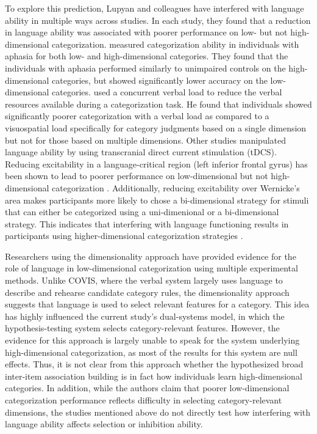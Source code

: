 \documentclass[../dissertation.tex]{subfiles}
\begin{document}
	To explore this prediction, Lupyan and colleagues have interfered with language ability in multiple ways across studies. In each study, they found that a reduction in language ability was associated with poorer performance on low- but not high-dimensional categorization. \citet{Lupyan2013} measured categorization ability in individuals with aphasia for both low- and high-dimensional categories. They found that the individuals with aphasia performed similarly to unimpaired controls on the high-dimensional categories, but showed significantly lower accuracy on the low-dimensional categories. \citet{Lupyan2009} used a concurrent verbal load to reduce the verbal resources available during a categorization task. He found that individuals showed significantly poorer categorization with a verbal load as compared to a visuospatial load specifically for category judgments based on a single dimension but not for those based on multiple dimensions. Other studies manipulated language ability by using transcranial direct current stimulation (tDCS). Reducing excitability in a language-critical region (left inferior frontal gyrus) has been shown to lead to poorer performance on low-dimensional but not high-dimensional categorization \citep{Lupyan2012b}. Additionally, reducing excitability over Wernicke's area makes participants more likely to chose  a bi-dimensional strategy for stimuli that can either be categorized using a uni-dimenional or a bi-dimensional strategy. This indicates that interfering with language functioning results in participants using higher-dimensional categorization strategies \citep{Perry2014}. \par 
	Researchers using the dimensionality approach have provided evidence for the role of language in low-dimensional categorization using multiple experimental methods. Unlike COVIS, where the verbal system largely uses language to describe and rehearse candidate category rules, the dimensionality approach suggests that language is used to select relevant features for a category. This idea has highly influenced the current study's dual-systems model, in which the hypothesis-testing system selects category-relevant features. However, the evidence for this approach is largely unable to speak for the system underlying high-dimensional categorization, as most of the results for this system are null effects. Thus, it is not clear from this approach whether the hypothesized broad inter-item association building is in fact how individuals learn high-dimensional categories. In addition, while the authors claim that poorer low-dimensional categorization performance reflects difficulty in selecting category-relevant dimensions, the studies mentioned above do not directly test how interfering with language ability affects selection or inhibition ability.
	
\end{document}
